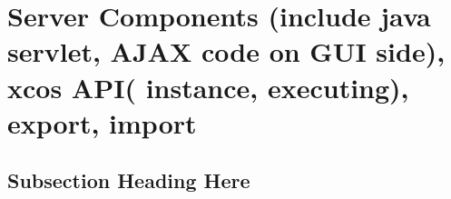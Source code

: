\documentclass[conference]{IEEEtran}
\begin{document}
\section{Server Components (include java servlet, AJAX code on GUI side), xcos API( instance, executing), export, import}
\blindtext

\subsection{Subsection Heading Here}
\blindtext


%
%



%
%
\end{document}

